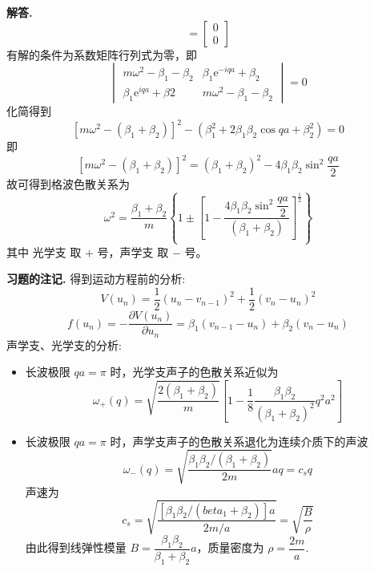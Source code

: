 \documentclass[11pt]{ctexart}
\newcounter{problemname}
\newenvironment{solution}{\par\noindent\textbf{解答. }}{\par}
\newenvironment{note}{\par\noindent\textbf{习题\arabic{problemname}的注记. }}{\par}
\begin{document}
\begin{solution}
\begin{equation*}
        =
        \begin{bmatrix}
            0 \\
            0
        \end{bmatrix}
    \end{equation*}
    有解的条件为系数矩阵行列式为零，即
    \begin{equation*}
        \begin{vmatrix}
            m\omega^2 - \beta_1 - \beta_2 & \beta_1\text{e}^{-iqa} + \beta_2 \\
            \beta_1\text{e}^{iqa} + \beta2 & m\omega^2 - \beta_1 -\beta_2
        \end{vmatrix}
        = 0
    \end{equation*}
    化简得到
    \begin{equation*}
        \left[m\omega^2 - (\beta_1 + \beta_2)\right]^2 - \left(\beta_1^2 + 2\beta_1\beta_2\cos{qa} + \beta_2^2\right) = 0
    \end{equation*}
    即
    \begin{equation*}
        \left[m\omega^2 - (\beta_1 + \beta_2)\right]^2 = (\beta_1 + \beta_2)^2 - 4\beta_1\beta_2\sin^2{\frac{qa}{2}}
    \end{equation*}
    故可得到格波色散关系为
    \begin{equation*}
        \omega^2 = \frac{\beta_1 + \beta_2}{m}\left\{1 \pm \left[1 - \frac{4\beta_1\beta_2\sin^2{\dfrac{qa}{2}}}{\left(\beta_1 + \beta_2\right)}\right]^{\frac{1}{2}}\right\}
    \end{equation*}
    其中 光学支 取 $+$ 号，声学支 取 $-$ 号。
\end{solution}
\begin{note}
    得到运动方程前的分析:
    $$V(u_n) = \dfrac{1}{2}(u_n - v_{n-1})^2 + \dfrac{1}{2}(v_n - u_n)^2$$
    $$f(u_n) = -\dfrac{\partial V(u_n)}{\partial u_n} = \beta_1(v_{n-1} - u_n) + \beta_2(v_n - u_n)$$
    声学支、光学支的分析:
    \begin{itemize}
        \item 长波极限 $qa = \pi$ 时，光学支声子的色散关系近似为
              $$\omega_+(q) = \sqrt{\frac{2(\beta_1 + \beta_2)}{m}}\left[1 - \frac{1}{8}\frac{\beta_1\beta_2}{(\beta_1 + \beta_2)^2}q^2a^2\right]$$
        \item 长波极限 $qa = \pi$ 时，声学支声子的色散关系退化为连续介质下的声波
              $$\omega_-(q) = \sqrt{\frac{\beta_1\beta_2/(\beta_1 + \beta_2)}{2m}}aq = c_sq$$
              声速为
              $$c_s = \sqrt{\frac{[\beta_1\beta_2/(beta_1 + \beta_2)]a}{2m/a}} = \sqrt{\frac{B}{\rho}}$$
              由此得到线弹性模量 $B = \dfrac{\beta_1\beta_2}{\beta_1+\beta_2}a$，质量密度为 $\rho = \dfrac{2m}{a}$.
    \end{itemize}
\end{note}
\end{document}
